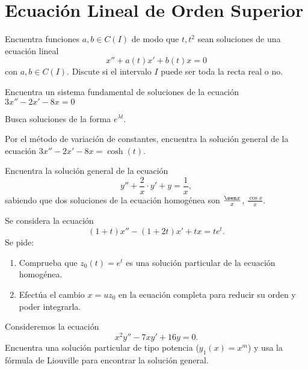 \section{Ecuación Lineal de Orden Superior}

\begin{ejercicio}\label{ej:4.1}
    Encuentra funciones $a, b \in C(I)$ de modo que $t, t^2$ sean soluciones de una ecuación lineal
    \[
        x'' + a(t)x' + b(t)x = 0
    \]
    con $a, b \in C(I)$. Discute si el intervalo $I$ puede ser toda la recta real o no.
\end{ejercicio}

\begin{ejercicio}\label{ej:4.2}
    Encuentra un sistema fundamental de soluciones de la ecuación $3x'' - 2x' - 8x = 0$
    \begin{observacion}
        Busca soluciones de la forma $e^{\lambda t}$.
    \end{observacion}
    Por el método de variación de constantes, encuentra la solución general de la ecuación $3x'' - 2x' - 8x = \cosh(t)$.
\end{ejercicio}

\begin{ejercicio}\label{ej:4.3}
    Encuentra la solución general de la ecuación
    \[
        y'' + \frac{2}{x}\cdot y' + y = \frac{1}{x},
    \]
    sabiendo que dos soluciones de la ecuación homogénea son $\frac{\sen x}{x}$, $\frac{\cos x}{x}$.
\end{ejercicio}

\begin{ejercicio}\label{ej:4.4}
    Se considera la ecuación
    \[
        (1 + t)x'' - (1 + 2t)x' + tx = t e^t.
    \]
    Se pide:
    \begin{enumerate}
        \item Comprueba que $z_0(t) = e^t$ es una solución particular de la ecuación homogénea.
        \item Efectúa el cambio $x = uz_0$ en la ecuación completa para reducir su orden y poder integrarla.
    \end{enumerate}
\end{ejercicio}

\begin{ejercicio}\label{ej:4.5}
    Consideremos la ecuación
    \[
        x^2 y'' - 7xy' + 16y = 0.
    \]
    Encuentra una solución particular de tipo potencia ($y_1(x) = x^m$) y usa la fórmula de Liouville para encontrar la solución general.
\end{ejercicio}

